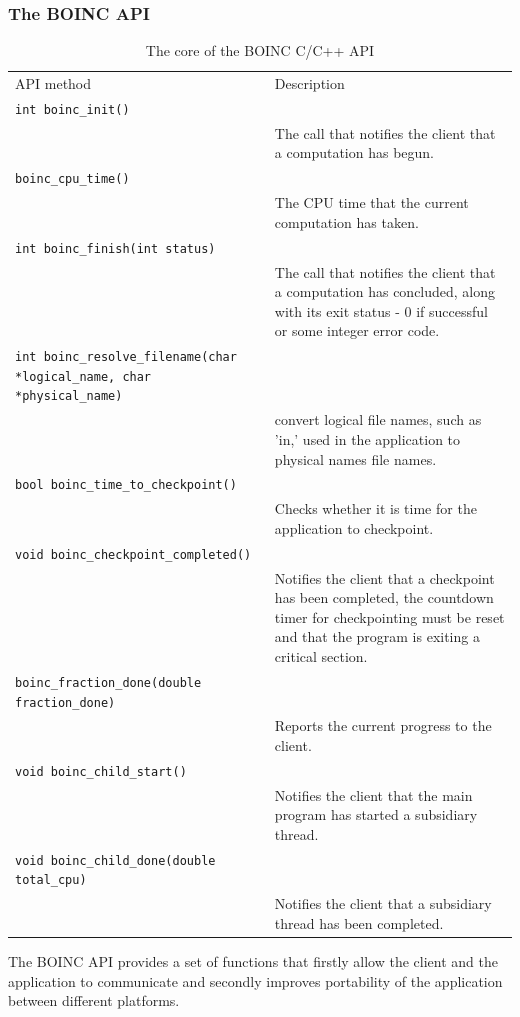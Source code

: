 \subsubsection{The BOINC API} \label{Bapi}
\begin{table}[htb] \centering
\caption{The core of the BOINC C/C++ API \cite{boincwiki}}
\begin{tabular}{p{2.5cm}p{11.6cm}}\toprule
 API method & Description\\ \cmidrule(r){1-2}
 \verb|int boinc_init()|\\ & The call that notifies the client that a computation has begun.\\
\verb|boinc_cpu_time()| \\ & The CPU time that the current computation has taken.\\
\verb|int boinc_finish(int status)| \\ & The call that notifies the client that a computation has concluded, along with its exit status - 0 if successful or some integer error code.\\
\verb|int boinc_resolve_filename(char *logical_name, char *physical_name)| \\ & convert logical file names, such as 'in,' used in the application to physical names file names. \\ 
\verb|bool boinc_time_to_checkpoint()| \\ & Checks whether it is time for the application to checkpoint.\\
\verb|void boinc_checkpoint_completed()| \\ & Notifies the client that a checkpoint has been completed, the countdown timer for checkpointing must be reset and that the program is exiting a critical section. 
\\ 
\verb|boinc_fraction_done(double fraction_done)| \\ & Reports the current progress to the client. \\ 
\verb|void boinc_child_start()| \\ & Notifies the client that the main program has started a subsidiary thread.\\
\verb|void boinc_child_done(double total_cpu)| \\ & Notifies the client that   a subsidiary thread has been completed. 
\\ \bottomrule
\end{tabular}\label{tab:api}
\end{table}
The BOINC API provides a set of functions that firstly allow the client and the application to communicate and secondly improves portability of the application between different platforms.
